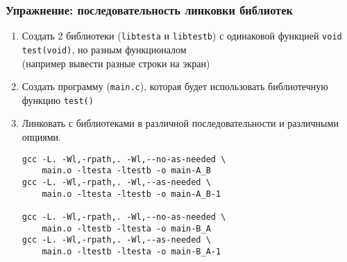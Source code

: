 

\begin{frame}
	\frametitle{Упражнение: последовательность линковки библиотек}

	\begin{enumerate}
		\item Создать 2 библиотеки ({\tt libtesta} и {\tt libtestb})
			с одинаковой функцией {\tt void test(void)}, но разным функционалом\\
			(например вывести разные строки на экран)
		\item Создать программу ({\tt main.c}), которая будет использовать 
			библиотечную функцию {\tt test()}
		\item Линковать с библиотеками в различной последовательности и различными опциями.
	\framebreak
\begin{verbatim}
gcc -L. -Wl,-rpath,. -Wl,--no-as-needed \
    main.o -ltesta -ltestb -o main-A_B
gcc -L. -Wl,-rpath,. -Wl,--as-needed \
    main.o -ltesta -ltestb -o main-A_B-1

gcc -L. -Wl,-rpath,. -Wl,--no-as-needed \
    main.o -ltestb -ltesta -o main-B_A
gcc -L. -Wl,-rpath,. -Wl,--as-needed \
    main.o -ltestb -ltesta -o main-B_A-1
\end{verbatim}
	\end{enumerate}
\end{frame}



